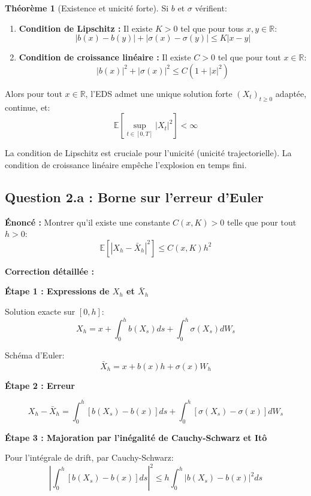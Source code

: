 \documentclass[12pt,a4paper]{article}
\theoremstyle{definition}
\newtheorem{theorem}{Théorème}[section]
\newcommand{\E}{\mathbb{E}}
\newcommand{\R}{\mathbb{R}}
\begin{document}
\begin{theorem}[Existence et unicité forte]
Si $b$ et $\sigma$ vérifient:
\begin{enumerate}
    \item \textbf{Condition de Lipschitz :} Il existe $K > 0$ tel que pour tous $x, y \in \R$:
    \[
    |b(x) - b(y)| + |\sigma(x) - \sigma(y)| \leq K|x - y|
    \]
    
    \item \textbf{Condition de croissance linéaire :} Il existe $C > 0$ tel que pour tout $x \in \R$:
    \[
    |b(x)|^2 + |\sigma(x)|^2 \leq C(1 + |x|^2)
    \]
\end{enumerate}
Alors pour tout $x \in \R$, l'EDS admet une unique solution forte $(X_t)_{t \geq 0}$ adaptée, continue, et:
\[
\E\left[ \sup_{t \in [0,T]} |X_t|^2 \right] < \infty
\]
\end{theorem}

\begin{attention}
La condition de Lipschitz est cruciale pour l'unicité (unicité trajectorielle). La condition de croissance linéaire empêche l'explosion en temps fini.
\end{attention}

\subsection{Question 2.a : Borne sur l'erreur d'Euler}

\textbf{Énoncé :} Montrer qu'il existe une constante $C(x, K) > 0$ telle que pour tout $h > 0$:
\[
\E\left[ |X_h - \bar{X}_h|^2 \right] \leq C(x, K) h^2
\]

\textbf{Correction détaillée :}

\textbf{Étape 1 : Expressions de $X_h$ et $\bar{X}_h$}

Solution exacte sur $[0, h]$:
\[
X_h = x + \int_0^h b(X_s) ds + \int_0^h \sigma(X_s) dW_s
\]

Schéma d'Euler:
\[
\bar{X}_h = x + b(x)h + \sigma(x)W_h
\]

\textbf{Étape 2 : Erreur}

\[
X_h - \bar{X}_h = \int_0^h [b(X_s) - b(x)] ds + \int_0^h [\sigma(X_s) - \sigma(x)] dW_s
\]

\textbf{Étape 3 : Majoration par l'inégalité de Cauchy-Schwarz et Itô}

Pour l'intégrale de drift, par Cauchy-Schwarz:
\[
\left| \int_0^h [b(X_s) - b(x)] ds \right|^2 \leq h \int_0^h |b(X_s) - b(x)|^2 ds
\]
\end{document}
